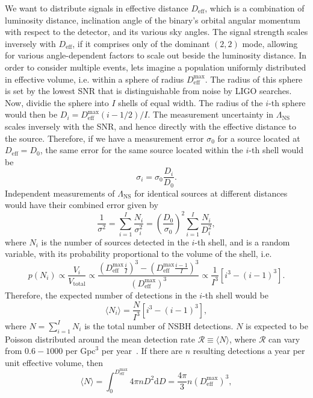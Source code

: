 \documentclass[aps,prd,amsmath,floats,floatfix, twocolumn,
superscriptaddress,nofootinbib,showpacs]{revtex4-1}
\newcommand{\D}{\mathrm{d}}
\newcommand{\lambdans}{\Lambda_\mathrm{NS}}
\newcommand{\deff}{D_\mathrm{eff}}
\begin{document}
We want to distribute signals in effective distance $\deff$, which is a combination of 
luminosity distance, inclination angle of the binary's orbital angular momentum
with respect to the detector, and its various sky angles. The signal strength 
scales inversely with $\deff$, if it comprises only of the dominant $(2,2)$ mode, allowing
for various angle-dependent factors to scale out beside the luminosity distance.
% 
In order to consider multiple events, lets imagine a population uniformly distributed
in effective volume, i.e. within a sphere of radius $\deff^\mathrm{max}$. The 
radius of this sphere is set by the lowest SNR that is distinguishable from noise
by LIGO searches. Now, dividie the sphere into $I$ shells of equal width. The radius
of the $i$-th sphere would then be $D_i = \deff^\mathrm{max} (i - 1/2)/I$. The 
measurement uncertainty in $\lambdans$ scales inversely with the SNR, and hence
directly with the effective distance to the source. Therefore, if we have a 
measurement error $\sigma_0$ for a source located at $\deff = D_0$, the same error
for the same source located within the $i$-th shell would be 
$$
\sigma_i = \sigma_0 \frac{D_i}{D_0}.
$$
Independent measurements of $\lambdans$ for identical sources at different distances
would have their combined error given by
\begin{equation}\label{eq:1oversigma}
\frac{1}{\sigma^2} = \sum_{i=1}^I \frac{N_i}{\sigma_i^2} = \left(\frac{D_0}{\sigma_0}\right)^2 \sum_{i=1}^I\frac{N_i}{D_i^2},
\end{equation}
where $N_i$ is the number of sources detected in the $i$-th shell, and is a random
variable, with its probability proportional to the volume of the shell, i.e.
$$
p(N_i) \propto \frac{V_i}{V_\mathrm{total}} \propto \dfrac{\left(\deff^\mathrm{max} \frac{i}{I}\right)^3 - \left(\deff^\mathrm{max} \frac{i-1}{I}\right)^3}{(\deff^\mathrm{max})^3} \propto \frac{1}{I^3} [i^3 - (i-1)^3].
$$
Therefore, the expected number of detections in the $i$-th shell would be
$$
\langle N_i\rangle = \frac{N}{I^3} [i^3 - (i-1)^3],
$$
where $N=\sum_{i=1}^I N_i$ is the total number of NSBH detections. $N$ is expected
to be Poisson distributed around the mean detection rate
$\mathcal{R}\equiv\langle N\rangle$, where $\mathcal{R}$ can vary from $0.6-1000$ per
$\mathrm{Gpc}^3$ per year~\cite{Abadie:2010cfa}. If there are $n$ resulting detections
a year per unit effective volume, then
\begin{equation}
\langle N\rangle = \int_0^{\deff^\mathrm{max}} 4\pi n D^2 \D D = \frac{4\pi}{3} n (\deff^\mathrm{max})^3,
\end{equation}
\end{document}
